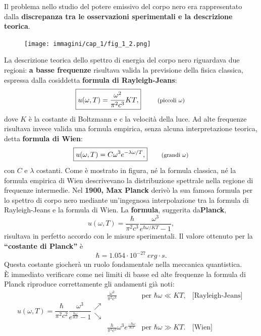 \documentclass[a4paper,12pt,oneside]{book}
\begin{document}
Il problema nello studio del potere emissivo del corpo nero era rappresentato dalla \textbf{discrepanza tra le osservazioni sperimentali e la descrizione teorica}.
\newpage
	\begin{figure}[!htbp]
		\begin{center}
			\texttt{[image: immagini/cap\_1/fig\_1\_2.png]}
		\end{center}
	\end{figure}
	
La descrizione teorica dello spettro di energia del corpo nero riguardava due regioni: \textbf{a basse frequenze} risultava valida la previsione della fisica classica, espressa dalla cosiddetta \textbf{formula di Rayleigh-Jeans}:
	\begin{equation}
		\boxed{
			u(\omega , T)= \frac{\omega ^2}{\pi ^2 c^3}KT,
		}
			\qquad \textrm{ \footnotesize{(piccoli $\omega$)} }
	\end{equation}
dove $K$ è la costante di Boltzmann e c la velocità della luce. Ad alte frequenze risultava invece valida una formula empirica, senza alcuna interpretazione teorica, detta \textbf{formula di Wien}:
	\begin{equation}
		\boxed{
			u(\omega ,T)= C \omega ^3 e^{-\lambda \omega /T},
		}
			\qquad \textrm{\footnotesize{(grandi $\omega$)}}
	\end{equation}
con $C$ e $\lambda$ costanti. Come è mostrato in figura, né la formula classica, né  la formula empirica di Wien descrivevano la distribuzione spettrale nella regione di frequenze intermedie.
Nel \textbf{1900, Max Planck} derivò la sua famosa formula per lo spettro di corpo nero mediante un'ingegnosa interpolazione tra la formula di Rayleigh-Jeans e la formula di Wien. La \textbf{formula}, suggerita da\textbf{Planck},
	\begin{equation}
	\boxed{\boxed{
		u(\omega, T) = \frac{\hbar}{\pi ^2 c^3}\frac{\omega ^3}{e^{\hbar \omega / KT}-1},
	}}
\end{equation}
risultava in perfetto accordo con le misure sperimentali. Il valore ottenuto per la \textbf{``costante di Planck''} è
\[ \boxed{\hbar = 1.054 \cdot 10^{-27} \ erg\cdot s.}\]
Questa costante giocherà un ruolo fondamentale nella meccanica quantistica.\\

È immediato verificare come nei limiti di basse ed alte frequenze la formula di Planck riproduce correttamente gli andamenti già noti:\\
\begin{equation}
u(\omega , T) =\frac{\hbar}{\pi ^2 c^2} \frac{\omega ^3}{e^{\frac{\hbar \omega}{KT}} -1} 
\begin{array}{clcc}
 & \displaystyle{\frac{\omega ^2}{\pi ^2 c^3} } & \textrm{per } \hbar \omega \ll KT, & \textrm{[Rayleigh-Jeans]}\\
\nearrow \\
\searrow \\
 & \displaystyle{\frac{h}{\pi ^2 c^3}\omega ^3 e^{\frac{-\hbar \omega}{KT}}} & \textrm{per }  \hbar \omega \gg KT .& \textrm{[Wien]}
\end{array}
\end{equation}
\end{document}
